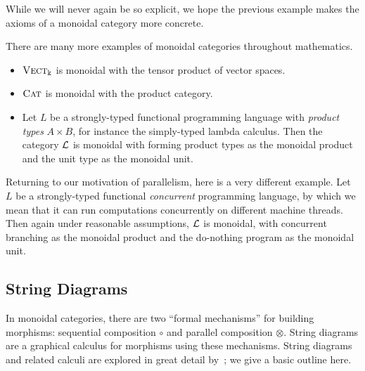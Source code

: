 While we will never again be so explicit, we hope the previous example makes the
axioms of a monoidal category more concrete.

\begin{ex}
  There are many more examples of monoidal categories throughout mathematics.
  \begin{itemize}
    \item ${\textsc{\text{Vect}}}_\Bbbk$ is monoidal with the tensor product of vector spaces.
    \item ${\textsc{\text{Cat}}}$ is monoidal with the product category.
    \item Let $L$ be a strongly-typed functional programming language with
      \emph{product types} $A\times B$, for instance the simply-typed lambda
      calculus. Then the category $\mathcal{L}$ is monoidal with forming product types as the
      monoidal product and the unit type as the monoidal unit.
  \end{itemize}
\end{ex}

\begin{ex}
  Returning to our motivation of parallelism, here is a very different example.
  Let $L$ be a strongly-typed functional \emph{concurrent} programming language,
  by which we mean that it can run computations concurrently on different
  machine threads. Then again under reasonable assumptions, $\mathcal{L}$ is monoidal,
  with concurrent branching as the monoidal product and the do-nothing program as
  the monoidal unit.
\end{ex}

\subsection{String Diagrams}
\label{sec:string diagrams}

In monoidal categories, there are two ``formal mechanisms'' for building
morphisms: sequential composition $\circ$ and parallel composition $\otimes$.
String diagrams are a graphical calculus for morphisms using these mechanisms.
String diagrams and related calculi are explored in great detail
by~\cite{selinger-2011}; we give a basic outline here.


